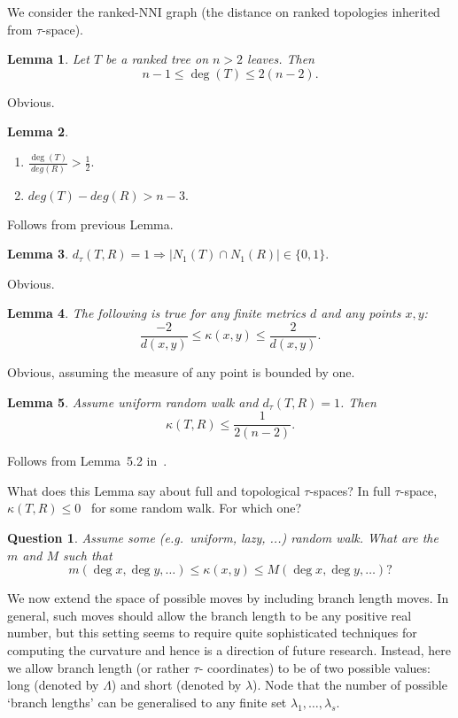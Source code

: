 \documentclass[12pt]{article}
\newtheorem{lemma}{Lemma}
\newtheorem{question}{Question}
\begin{document}


We consider the ranked-NNI graph (the distance on ranked topologies inherited from 
$\tau$-space). 

\begin{lemma}
Let $T$ be a ranked tree on $n>2$ leaves. Then \[n-1\leq \deg(T)\leq2(n-2).\] 
\end{lemma}

\proof
Obvious. 
\endproof

\begin{lemma}
\begin{enumerate}[(1)]
\item $\frac{\deg(T)}{deg(R)}>\frac12.$
\item $deg(T)-deg(R)> n-3.$
\end{enumerate}
\end{lemma}

\proof
Follows from previous Lemma. 
\endproof

\begin{lemma}
$d_{\tau}(T,R) = 1 \Rightarrow |N_1(T)\cap N_1(R)|\in\{0,1\}.$
\end{lemma}

\proof
Obvious.
\endproof

\begin{lemma}
The following is true for any finite metrics $d$ and any points $x,y$:
\[
\frac{-2}{d(x,y)} \leq \kappa(x,y) \leq \frac{2}{d(x,y)}.
\]
\end{lemma}

\proof
Obvious, assuming the measure of any point is bounded by one. 
\endproof


\begin{lemma}
Assume uniform random walk and $d_\tau(T,R) = 1$. Then \[\kappa(T,R) \leq 
\frac{1}{2(n-2)}.\]
\end{lemma}

\proof
Follows from Lemma~5.2 in~\cite{WhiddenMatsen}. 
\endproof

What does this Lemma say about full and topological $\tau$-spaces? In full $\tau$-space,
$\kappa(T,R) \leq 0$~\cite{GD} for some random walk. For which one? 

\begin{question}
Assume some (e.g.\ uniform, lazy, ...) random walk. What are the $m$ and $M$ 
such that 
\[
m(\deg x,\deg y, \ldots) \leq \kappa(x,y) \leq M(\deg x, \deg y, \ldots)? 
\]
\end{question}

We now extend the space of possible moves by including branch length moves. In general,
such moves should allow the branch length to be any positive real number, but this setting
seems to require quite sophisticated techniques for computing the curvature and hence is 
a direction of future research. Instead, here we allow branch length (or rather $\tau$-
coordinates) to be of two possible values: long (denoted by $\Lambda$) and short (denoted 
by $\lambda$). Node that the number of possible `branch lengths' can be generalised 
to any finite set $\lambda_1,\ldots,\lambda_s$. 
\end{document}
